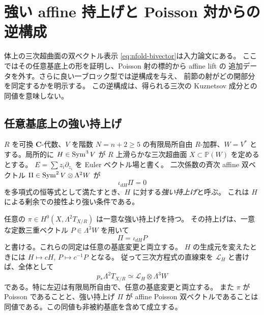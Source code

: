 \section{強い affine 持上げと Poisson 対からの逆構成}
\label{sec:poisson-inverse}

体上の三次超曲面の双ベクトル表示
\eqref{eq:nfold-bivector}は入力論文\cite[命題
\texttt{prop:pg-represent}]{NCCubicA}にある。
ここではその任意基底上の形を証明し、Poisson 射の標的から affine lift の
追加データを外す。さらに良い一ブロック型では逆構成を与え、
前節の射がどの開部分を同定するかを明示する。
この逆構成は、得られる三次の Kuznetsov 成分との同値を意味しない。

\subsection{任意基底上の強い持上げ}

$R$ を可換 $\mathbf C$-代数、$V$ を階数 $N=n+2\ge5$ の有限局所自由
$R$-加群、$W=V^*$ とする。局所的に
$H\in\operatorname{Sym}^3V$ が $R$ 上滑らかな三次超曲面
$X\subset\mathbb P(W)$ を定めるとする。
$E=\sum z_i\partial_{z_i}$ を Euler ベクトル場と書く。
二次係数の斉次 affine 双ベクトル
$\Pi\in\operatorname{Sym}^2V\otimes\Lambda^2W$ が
\[
 \iota_{dH}\Pi=0
\]
を多項式の恒等式として満たすとき、$H$ に対する\emph{強い持上げ}と呼ぶ。
これは $H$ による剰余での接性より強い条件である。

\begin{theorem}
\label{thm:poisson-strong-lift}
任意の $\pi\in H^0(X,\Lambda^2T_{X/R})$ は一意な強い持上げを持つ。
その持上げは、一意な定数三重ベクトル $P\in\Lambda^3W$ を用いて
\[
 \Pi=\iota_{dH}P
\]
と書ける。これらの同定は任意の基底変更と両立する。
$H$ の生成元を変えたときには $H\mapsto cH$, $P\mapsto c^{-1}P$ となる。
従って三次方程式の直線束を $\mathcal L_H$ と書けば、全体として
\begin{equation}\label{eq:poisson-relative-bivectors}
 p_*\Lambda^2T_{X/R}\simeq\mathcal L_H\otimes\Lambda^3W
\end{equation}
である。特に左辺は有限局所自由で、任意の基底変更と両立する。
また $\pi$ が Poisson であることと、強い持上げ $\Pi$ が affine Poisson
双ベクトルであることは同値である。この同値も非被約基底を含めて成立する。
\end{theorem}


